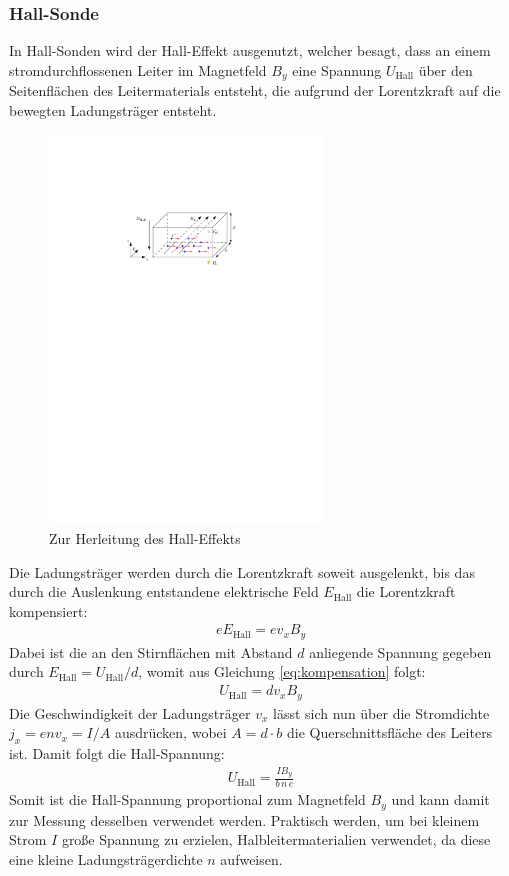 \documentclass[11pt, a4paper]{article}
\begin{document}
\subsubsection{Hall-Sonde}
In Hall-Sonden wird der Hall-Effekt ausgenutzt, welcher besagt, dass an einem stromdurchflossenen Leiter im Magnetfeld $B_y$ eine Spannung $U_\mathrm{Hall}$ über den Seitenflächen des Leitermaterials entsteht, die aufgrund der Lorentzkraft auf die bewegten Ladungsträger entsteht.
\begin{figure}[h]
	\centering
	\includegraphics[width=0.65\textwidth]{./figures/hall_effekt.pdf}
	\caption{Zur Herleitung des Hall-Effekts}
	\label{fig:hall_effekt}
\end{figure}
Die Ladungsträger werden durch die Lorentzkraft soweit ausgelenkt, bis das durch die Auslenkung entstandene elektrische Feld $E_\mathrm{Hall}$ die Lorentzkraft kompensiert:
\begin{align}
	e E_\mathrm{Hall} = e v_x B_y
	\label{eq:kompensation}
\end{align}
Dabei ist die an den Stirnflächen mit Abstand $d$ anliegende Spannung gegeben durch $E_\mathrm{Hall} = U_\mathrm{Hall} / d$, womit aus Gleichung \ref{eq:kompensation} folgt:
\begin{align}
	U_\mathrm{Hall} = d v_x B_y
\end{align}
Die Geschwindigkeit der Ladungsträger $v_x$ lässt sich nun über die Stromdichte $j_x = e n v_x = I/A$ ausdrücken, wobei $A = d \cdot b$ die Querschnittsfläche des Leiters ist.
Damit folgt die Hall-Spannung:
\begin{align}
	U_\mathrm{Hall} = \frac{I B_y}{b\, n\, e}
\end{align}
Somit ist die Hall-Spannung proportional zum Magnetfeld $B_y$ und kann damit zur Messung desselben verwendet werden.
Praktisch werden, um bei kleinem Strom $I$ große Spannung zu erzielen, Halbleitermaterialien verwendet, da diese eine kleine Ladungsträgerdichte $n$ aufweisen.
\end{document}
